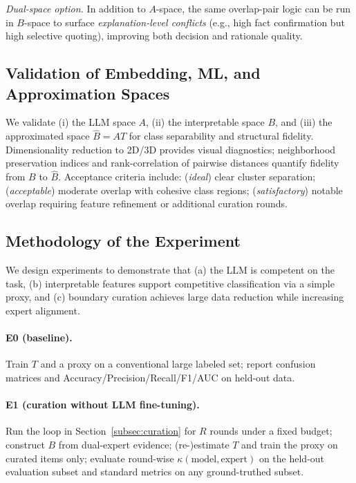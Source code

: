 \documentclass[ai,article,submit,pdftex,moreauthors]{Definitions/mdpi}
\begin{document}
\emph{Dual-space option.} In addition to $A$-space, the same overlap-pair logic can be run in $B$-space to surface \emph{explanation-level conflicts} (e.g., high fact confirmation but high selective quoting), improving both decision and rationale quality.

\subsection{Validation of Embedding, ML, and Approximation Spaces}\label{subsec:validation}
We validate (i) the LLM space $A$, (ii) the interpretable space $B$, and (iii) the approximated space $\widehat{B}=AT$ for class separability and structural fidelity. Dimensionality reduction to 2D/3D provides visual diagnostics; neighborhood preservation indices and rank-correlation of pairwise distances quantify fidelity from $B$ to $\widehat{B}$. Acceptance criteria include: (\emph{ideal}) clear cluster separation; (\emph{acceptable}) moderate overlap with cohesive class regions; (\emph{satisfactory}) notable overlap requiring feature refinement or additional curation rounds.

\subsection{Methodology of the Experiment}\label{subsec:methodology}
We design experiments to demonstrate that (a) the LLM is competent on the task, (b) interpretable features support competitive classification via a simple proxy, and (c) boundary curation achieves large data reduction while increasing expert alignment.

\paragraph{E0 (baseline).}
Train $T$ and a proxy on a conventional large labeled set; report confusion matrices and Accuracy/Precision/Recall/F1/AUC on held-out data.

\paragraph{E1 (curation without LLM fine-tuning).}
Run the loop in Section~\ref{subsec:curation} for $R$ rounds under a fixed budget; construct $B$ from dual-expert evidence; (re-)estimate $T$ and train the proxy on curated items only; evaluate round-wise $\kappa(\text{model},\text{expert})$ on the held-out evaluation subset and standard metrics on any ground-truthed subset. 
%
%  
\end{document}
